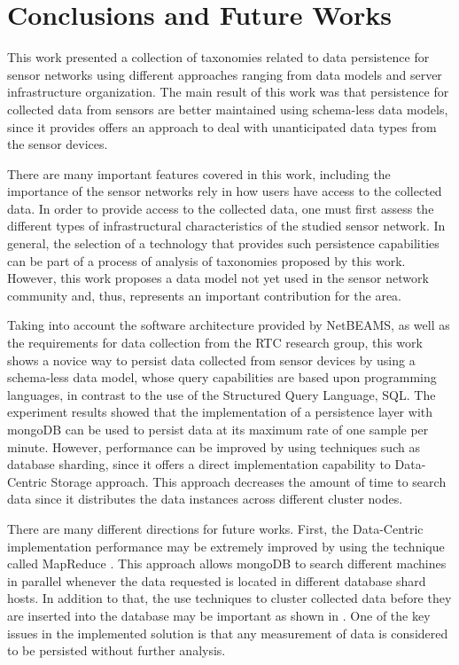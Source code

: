 

\chapter{Conclusions and Future Works}

This work presented a collection of taxonomies related to data persistence for
sensor networks using different approaches ranging from data models and server
infrastructure organization. The main result of this work was that persistence
for collected data from sensors are better maintained using schema-less data
models, since it provides offers an approach to deal with unanticipated data
types from the sensor devices.

There are many important features covered in this work, including the
importance of the sensor networks rely in how users have access to the
collected data. In order to provide access to the collected data, one must
first assess the different types of infrastructural characteristics of the
studied sensor network. In general, the selection of a technology that
provides such persistence capabilities can be part of a process of analysis of
taxonomies proposed by this work. However, this work proposes a data model not
yet used in the sensor network community and, thus, represents an important
contribution for the area.

Taking into account the software architecture provided by NetBEAMS, as well as
the requirements for data collection from the RTC research group, this work
shows a novice way to persist data collected from sensor devices by using a
schema-less data model, whose query capabilities are based upon programming
languages, in contrast to the use of the Structured Query Language, SQL. The
experiment results showed that the implementation of a persistence layer with
mongoDB can be used to persist data at its maximum rate of one sample per
minute. However, performance can be improved by using techniques such as
database sharding, since it offers a direct implementation capability to
Data-Centric Storage approach. This approach decreases the amount of time to
search data since it distributes the data instances across different cluster
nodes.

There are many different directions for future works. First, the Data-Centric
implementation performance may be extremely improved by using the technique
called MapReduce \cite{map-reduce}. This approach allows mongoDB to search
different machines in parallel whenever the data requested is located in
different database shard hosts. In addition to that, the use techniques to
cluster collected data before they are inserted into the database may be
important as shown in \cite{sn-time-series}. One of the key issues in the
implemented solution is that any measurement of data is considered to be
persisted without further analysis.

